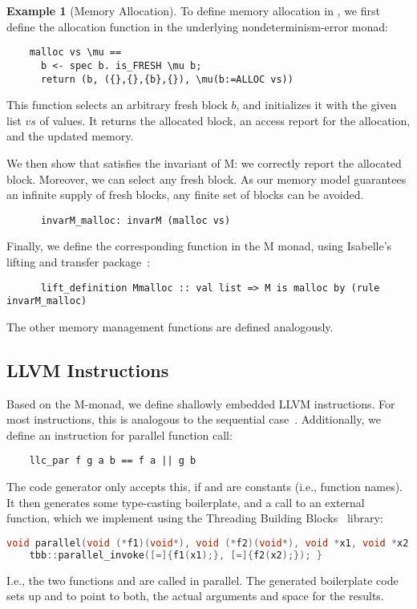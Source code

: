 \documentclass[sn-mathphys,Numbered]{sn-jnl}
\theoremstyle{thmstyleone}%
\theoremstyle{definition}%
\newtheorem{example}{Example}%
\theoremstyle{thmstylethree}%
\begin{document}
  \begin{example}[{Memory Allocation}]
    To define memory allocation in , we first define the allocation function in the underlying nondeterminism-error monad:
    \begin{lstlisting}
    malloc vs \mu ==
      b <- spec b. is_FRESH \mu b;
      return (b, ({},{},{b},{}), \mu(b:=ALLOC vs))
    \end{lstlisting}
    This function selects an arbitrary fresh block \is$b$, and initializes it with the given list \is$vs$ of values.
    It returns the allocated block, an access report for the allocation, and the updated memory.

    We then show that  satisfies the invariant of M: we correctly report the allocated block.
    Moreover, we can select any fresh block. As our memory model guarantees an infinite supply of fresh blocks,
    any finite set of blocks can be avoided.
    \begin{lstlisting}
      invarM_malloc: invarM (malloc vs)
    \end{lstlisting}

    Finally, we define the corresponding function in the M monad, using Isabelle's lifting and transfer package~\cite{HuKu13}:
    \begin{lstlisting}
      lift_definition Mmalloc :: val list => M is malloc by (rule invarM_malloc)
    \end{lstlisting}
    The other memory management functions are defined analogously.
  \end{example}

  \subsection{LLVM Instructions}
  Based on the M-monad, we define shallowly embedded LLVM instructions. For most instructions,
  this is analogous to the sequential case~\cite{La19-llvm}.
  Additionally, we define an instruction for parallel function call:
  \begin{lstlisting}
    llc_par f g a b == f a || g b
  \end{lstlisting}
  The code generator only accepts this, if  and  are constants (i.e., function names).
  It then generates some type-casting boilerplate, and a call to an external
   function, which we implement using the Threading Building Blocks~\cite{TBB} library:
  \begin{lstlisting}[language=C++]
  void parallel(void (*f1)(void*), void (*f2)(void*), void *x1, void *x2) {
    tbb::parallel_invoke([=]{f1(x1);}, [=]{f2(x2);}); }
  \end{lstlisting}
  I.e., the two functions  and  are called in parallel. The generated boilerplate code sets up  and  to point to both, the actual arguments and space for the results.
\end{document}
